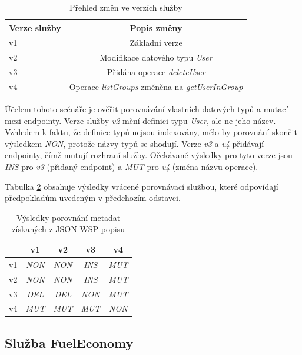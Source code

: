 \documentclass[czech,DP]{thesiskiv}
\begin{document}
\begin{table}[h]
	\centering
	\begin{tabular}{|l|c|}
		\hline
		Verze služby & Popis změny \\
		\hline
		\hline
		v1 & Základní verze \\
		\hline
		v2 & Modifikace datového typu \textit{User} \\
		\hline
		v3 & Přidána operace \textit{deleteUser} \\
		\hline
		v4 & Operace \textit{listGroups} změněna na \textit{getUserInGroup} \\
		\hline
	\end{tabular}
	\caption{Přehled změn ve verzích služby}
	\label{tab:json-wsp-diffs}
\end{table}

Účelem tohoto scénáře je ověřit porovnávání vlastních datových typů a mutací mezi endpointy. Verze služby \textit{v2} mění definici typu \textit{User}, ale ne jeho název. Vzhledem k faktu, že definice typů nejsou indexovány, mělo by porovnání skončit výsledkem \textit{NON}, protože názvy typů se shodují. Verze \textit{v3} a \textit{v4} přidávají endpointy, čímž mutují rozhraní služby. Očekávané výsledky pro tyto verze jsou \textit{INS} pro \textit{v3} (přidaný endpoint) a \textit{MUT} pro \textit{v4} (změna názvu operace).

Tabulka \ref{tab:jsonwsp-cmp-res} obsahuje výsledky vrácené porovnávací službou, které odpovídají předpokladům uvedeným v předchozím odstavci.

\begin{table}[h]
	\centering
	\begin{tabular}{|l||c|c|c|c|}
		\hline
		& v1 & v2 & v3 & v4 \\
		\hline
		\hline
		v1 & \textit{NON} & \textit{NON} & \textit{INS} & \textit{MUT} \\
		\hline
		v2 & \textit{NON} & \textit{NON} & \textit{INS} & \textit{MUT} \\
		\hline
		v3 & \textit{DEL} & \textit{DEL} & \textit{NON} & \textit{MUT} \\
		\hline
		v4 & \textit{MUT} & \textit{MUT} & \textit{MUT} & \textit{NON} \\
		\hline
	\end{tabular}
	\caption{Výsledky porovnání metadat získaných z JSON-WSP popisu}
	\label{tab:jsonwsp-cmp-res}
\end{table}


\subsection{Služba FuelEconomy}
\end{document}
